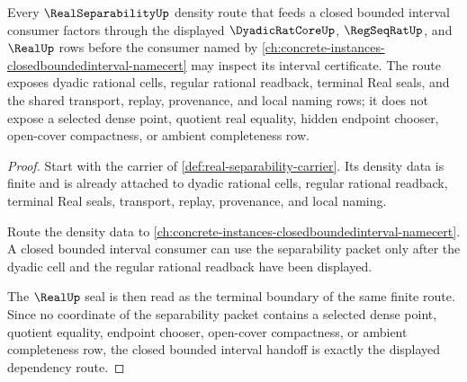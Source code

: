\begin{theorem}
\label{thm:real-separability-closed-bounded-interval-route}
Every $\RealSeparabilityUp$ density route that feeds a closed bounded interval consumer factors through the displayed $\DyadicRatCoreUp$, $\RegSeqRatUp$, and $\RealUp$ rows before the consumer named by \autoref{ch:concrete-instances-closedboundedinterval-namecert} may inspect its interval certificate. The route exposes dyadic rational cells, regular rational readback, terminal Real seals, and the shared transport, replay, provenance, and local naming rows; it does not expose a selected dense point, quotient real equality, hidden endpoint chooser, open-cover compactness, or ambient completeness row.
\end{theorem}
\begin{proof}
Start with the carrier of \autoref{def:real-separability-carrier}. Its density data is finite and is already attached to dyadic rational cells, regular rational readback, terminal Real seals, transport, replay, provenance, and local naming.

Route the density data to \autoref{ch:concrete-instances-closedboundedinterval-namecert}. A closed bounded interval consumer can use the separability packet only after the dyadic cell and the regular rational readback have been displayed.

The $\RealUp$ seal is then read as the terminal boundary of the same finite route. Since no coordinate of the separability packet contains a selected dense point, quotient equality, endpoint chooser, open-cover compactness, or ambient completeness row, the closed bounded interval handoff is exactly the displayed dependency route.
\end{proof}
